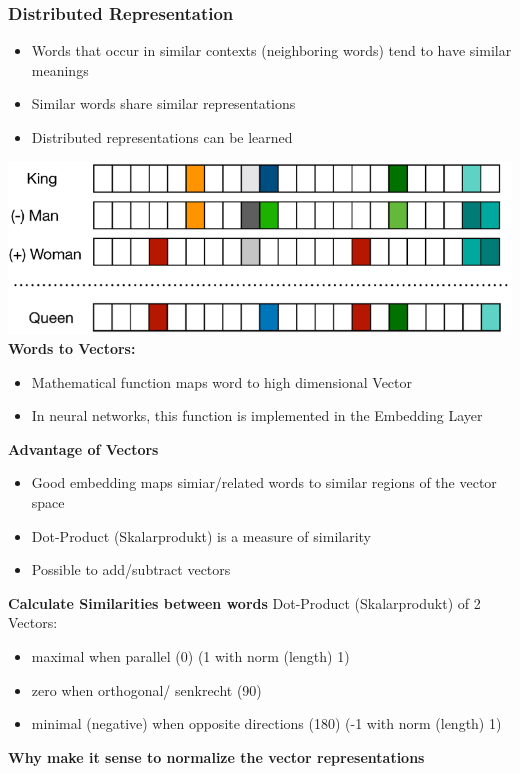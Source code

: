 \subsubsection{Distributed Representation}
\begin{itemize}
    \item Words that occur in similar contexts (neighboring words) tend to have similar meanings
    \item Similar words share similar representations
    \item Distributed representations can be learned
\end{itemize}
\includegraphics[width=.8\linewidth]{./img/distributed_representation.png}\\
\textbf{Words to Vectors:}
\begin{itemize}
    \item Mathematical function maps word to high dimensional Vector
    \item In neural networks, this function is implemented in the Embedding Layer
\end{itemize}
\textbf{Advantage of Vectors}
\begin{itemize}
    \item Good embedding maps simiar/related words to similar regions of the vector space
    \item Dot-Product (Skalarprodukt) is a measure of similarity
    \item Possible to add/subtract vectors
\end{itemize}
\textbf{Calculate Similarities between words}
Dot-Product (Skalarprodukt) of 2 Vectors:
\begin{itemize}
    \item maximal when parallel (0\textdegree) (1 with norm (length) 1)
    \item zero when orthogonal/ senkrecht (90\textdegree)
    \item minimal (negative) when opposite directions (180\textdegree) (-1 with norm (length) 1)
\end{itemize}
\textbf{Why make it sense to normalize the vector representations }
